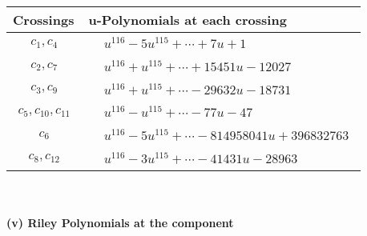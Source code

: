 \documentclass[1p]{elsarticle_modified}
\theoremstyle{definition}
\begin{document}
\begin{tabular}{m{50pt}|m{274pt}}
Crossings & \hspace{64pt}u-Polynomials at each crossing \\
\hline $$\begin{aligned}c_{1},c_{4}\end{aligned}$$&$\begin{aligned}
&u^{116}-5 u^{115}+\cdots+7 u+1
\end{aligned}$\\
\hline $$\begin{aligned}c_{2},c_{7}\end{aligned}$$&$\begin{aligned}
&u^{116}+u^{115}+\cdots+15451 u-12027
\end{aligned}$\\
\hline $$\begin{aligned}c_{3},c_{9}\end{aligned}$$&$\begin{aligned}
&u^{116}+u^{115}+\cdots-29632 u-18731
\end{aligned}$\\
\hline $$\begin{aligned}c_{5},c_{10},c_{11}\end{aligned}$$&$\begin{aligned}
&u^{116}- u^{115}+\cdots-77 u-47
\end{aligned}$\\
\hline $$\begin{aligned}c_{6}\end{aligned}$$&$\begin{aligned}
&u^{116}-5 u^{115}+\cdots-814958041 u+396832763
\end{aligned}$\\
\hline $$\begin{aligned}c_{8},c_{12}\end{aligned}$$&$\begin{aligned}
&u^{116}-3 u^{115}+\cdots-41431 u-28963
\end{aligned}$\\
\hline
\end{tabular}\\~\\
\newpage\renewcommand{\arraystretch}{1}
\flushleft \textbf{(v) Riley Polynomials at the component}\newline \\
\end{document}
